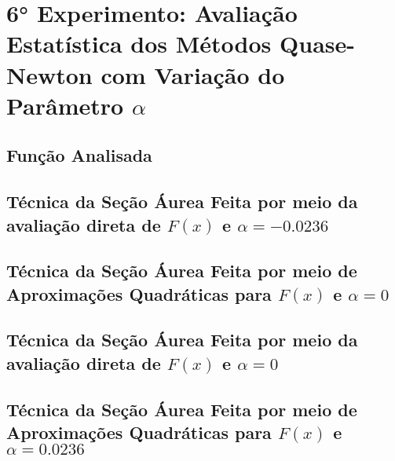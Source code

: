 \section{6° Experimento: Avaliação Estatística dos Métodos Quase-Newton com Variação do Parâmetro $\alpha$}
    \subsection{Função Analisada}

    \subsection{Técnica da Seção Áurea Feita por meio da avaliação direta de $F(x)$ e $\alpha=-0.0236$}
        
    \subsection{Técnica da Seção Áurea Feita por meio de Aproximações Quadráticas para $F(x)$ e $\alpha=0$}   
        
    \subsection{Técnica da Seção Áurea Feita por meio da avaliação direta de $F(x)$ e $\alpha=0$}
        
    \subsection{Técnica da Seção Áurea Feita por meio de Aproximações Quadráticas para $F(x)$ e $\alpha=0.0236$}
        
\newpage